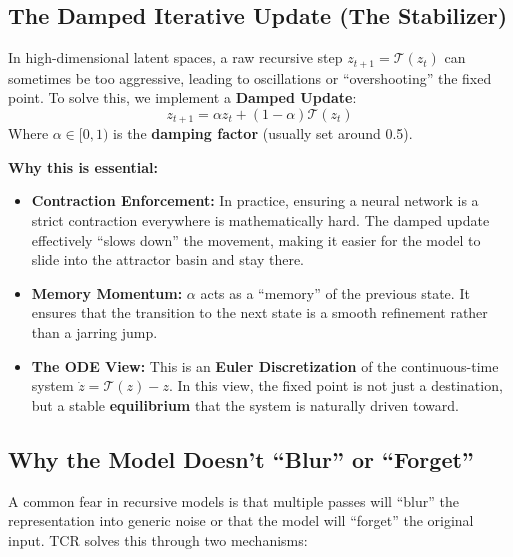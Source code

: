 \documentclass[11pt, a4paper]{article}
\begin{document}
\subsection{The Damped Iterative Update (The Stabilizer)}
In high-dimensional latent spaces, a raw recursive step $z_{t+1} = \mathcal{T}(z_t)$ can sometimes be too aggressive, leading to oscillations or ``overshooting'' the fixed point. To solve this, we implement a \textbf{Damped Update}:
\begin{equation}
 z_{t+1} = \alpha z_t + (1 - \alpha) \mathcal{T}(z_t) 
\end{equation}
Where $\alpha \in [0, 1)$ is the \textbf{damping factor} (usually set around 0.5).

\textbf{Why this is essential:}
\begin{itemize}
    \item \textbf{Contraction Enforcement:} In practice, ensuring a neural network is a strict contraction everywhere is mathematically hard. The damped update effectively ``slows down'' the movement, making it easier for the model to slide into the attractor basin and stay there.
    \item \textbf{Memory Momentum:} $\alpha$ acts as a ``memory'' of the previous state. It ensures that the transition to the next state is a smooth refinement rather than a jarring jump.
    \item \textbf{The ODE View:} This is an \textbf{Euler Discretization} of the continuous-time system $\dot{z} = \mathcal{T}(z) - z$. In this view, the fixed point is not just a destination, but a stable \textbf{equilibrium} that the system is naturally driven toward.
\end{itemize}

\subsection{Why the Model Doesn't ``Blur'' or ``Forget''}
A common fear in recursive models is that multiple passes will ``blur'' the representation into generic noise or that the model will ``forget'' the original input. TCR solves this through two mechanisms:
\end{document}
